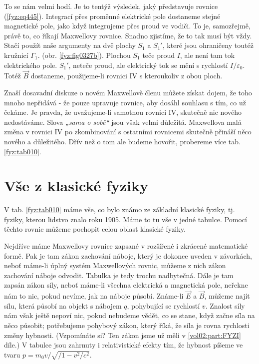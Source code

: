   To se nám velmi hodí. Je to tentýž výsledek, jaký představuje rovnice (\ref{fyz:eq445}). 
  Integrací přes proměnné elektrické pole dostaneme stejné magnetické pole, jako když integrujeme 
  přes proud ve vodiči. To je, samozřejmě, právě to, co říkají Maxwellovy rovnice. Snadno zjistíme, 
  že to tak musí být vždy. Stačí použít naše argumenty na dvě plochy \(S_1\) a \(S_1'\), které jsou 
  ohraničeny toutéž kružnicí \(\Gamma_1\). (obr. \ref{fyz:fig0327b}). Plochou \(S_1\) teče proud 
  \(I\), ale není tam tok elektrického pole. \(S_1'\), neteče proud, ale elektrický tok se mění s 
  rychlostí \(I/\varepsilon_0\). Totéž \(\vec{B}\) dostaneme, použijeme-li rovnici IV s kteroukoliv 
  z obou ploch. 
  
  Znaší dosavadní diskuze o novém Maxwellově členu můžete získat dojem, že toho mnoho nepřidává - 
  že pouze upravuje rovnice, aby dosáhl souhlasu s tím, co už čekáme. Je pravda, že uvažujeme-li 
  samotnou rovnici IV, skutečně nic nového nedostáváme. Slova \emph{„sama o sobě“} jsou však velmi 
  důležitá. Maxwellova malá změna v rovnici IV po zkombinování s ostatními rovnicemi skutečně 
  přináší něco nového a důležitého. Dřív než o tom ale budeme hovořit, probereme více tab. 
  \ref{fyz:tab010}.
  
\section{Vše z klasické fyziky}\label{fyz:IIchapXVIIIsecII}
  V tab. \ref{fyz:tab010} máme vše, co bylo známo ze základní klasické fyziky, tj. fyziky, kterou 
  lidstvo znalo roku 1905. Máme to tu vše v jedné tabulce. Pomocí těchto rovnic můžeme pochopit 
  celou oblast klasické fyziky.
  
  Nejdříve máme Maxwellovy rovnice zapsané v rozšířené i zkrácené matematické formě. Pak je tam 
  zákon zachování náboje, který je dokonce uveden v závorkách, neboť máme-li úplný systém 
  Maxwellových rovnic, můžeme z nich zákon zachování náboje odvodit. Tabulka je tedy trochu 
  nadbytečná. Dále je tam zapsán zákon síly, neboť máme-li všechna elektrická a magnetická pole, 
  neřekne nám to nic, pokud nevíme, jak na náboje působí. Známe-li \(\vec{E}\) a \(\vec{B}\), 
  můžeme najít sílu, která působí na objekt s nábojem \(q\), pohybující se rychlostí \(v\). Znalost 
  síly nám však ještě nepoví nic, pokud nebudeme vědět, co se stane, když začne síla na něco 
  působit; potřebujeme pohybový zákon, který říká, že síla je rovna rychlosti změny hybnosti. 
  (Vzpomínáte si? Ten zákon jsme už měli v \ref{vol02:part:FYZI} díle.) V tabulce jsou zahrnuty i 
  relativistické efekty tím, že hybnost píšeme ve tvaru \(p = m_0v/\sqrt{/1 - v^2/c^2}\).
  
